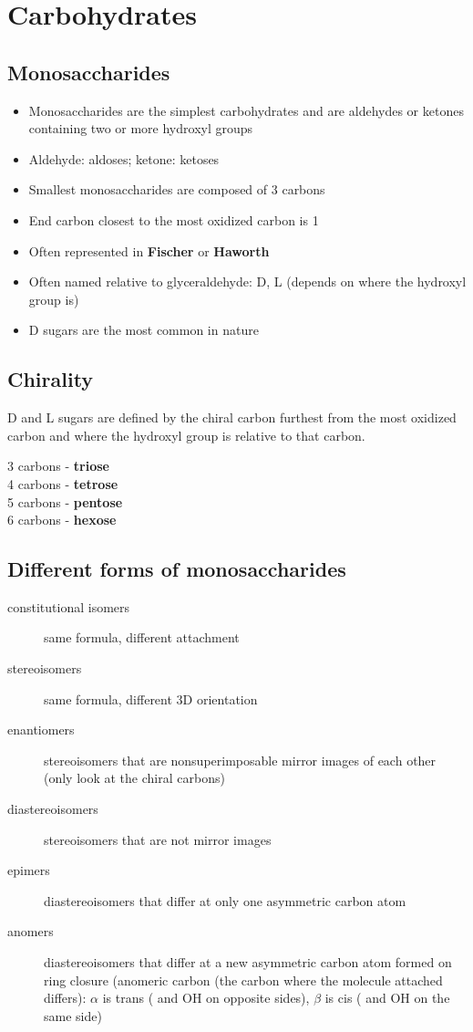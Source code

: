 \documentclass[letterpaper, 12pt]{article}
\begin{document}
\newpage

\section*{Carbohydrates}

\subsection*{Monosaccharides}
\begin{itemize}
\item Monosaccharides are the simplest carbohydrates and are aldehydes or ketones containing two or more hydroxyl groups
\item Aldehyde: aldoses; ketone: ketoses
\item Smallest monosaccharides are composed of 3 carbons
\item End carbon closest to the most oxidized carbon is 1
\item Often represented in \textbf{Fischer} or \textbf{Haworth}
\item Often named relative to glyceraldehyde: D, L (depends on where the hydroxyl group is)
\item D sugars are the most common in nature
\end{itemize}

\subsection*{Chirality}
D and L sugars are defined by the chiral carbon furthest from the most oxidized carbon and where the hydroxyl group is relative to that carbon.

3 carbons - \textbf{triose} \\
4 carbons - \textbf{tetrose} \\
5 carbons - \textbf{pentose} \\
6 carbons - \textbf{hexose}

\subsection*{Different forms of monosaccharides}

\begin{description}
\item [constitutional isomers] same formula, different attachment
\item [stereoisomers] same formula, different 3D orientation
\item [enantiomers] stereoisomers that are nonsuperimposable mirror images of each other (only look at the chiral carbons)
\item [diastereoisomers] stereoisomers that are not mirror images
\item [epimers] diastereoisomers that differ at only one asymmetric carbon atom
\item [anomers] diastereoisomers that differ at a new asymmetric carbon atom formed on ring closure (anomeric carbon (the carbon where the molecule attached differs): $\alpha$ is trans ( and OH on opposite sides), $\beta$ is cis ( and OH on the same side)
\end{description}
\end{document}

